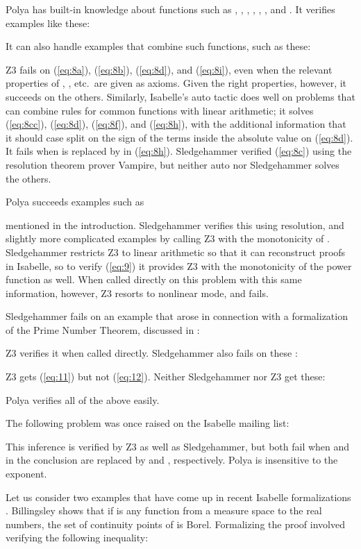 \documentclass[runningheds]{llncs}
\begin{document}
Polya has built-in knowledge about functions such as , , , , , , and . It verifies examples like these:

\noindent It can also handle examples that combine such functions, such as these:

Z3 fails on (\ref{eq:8a}), (\ref{eq:8b}), (\ref{eq:8d}), and (\ref{eq:8i}), even when the relevant properties of , , etc.\ are given as axioms. Given the right properties, however, it succeeds on the others. Similarly, Isabelle's auto tactic does well on problems that can combine rules for common functions with linear arithmetic; it solves (\ref{eq:8cc}), (\ref{eq:8d}), (\ref{eq:8f}), and (\ref{eq:8h}), with the additional information that it should case split on the sign of the terms inside the absolute value on (\ref{eq:8d}). It fails when  is replaced by  in (\ref{eq:8h}). Sledgehammer verified (\ref{eq:8c}) using the resolution theorem prover Vampire, but neither auto nor Sledgehammer solves the others.

Polya succeeds examples such as

mentioned in the introduction. Sledgehammer verifies this using resolution, and slightly more complicated examples by calling Z3 with the monotonicity of . Sledgehammer restricts Z3 to linear arithmetic so that it can reconstruct proofs in Isabelle, so to verify (\ref{eq:9}) it provides Z3 with the monotonicity of the power function as well. When called directly on this problem with this same information, however, Z3 resorts to nonlinear mode, and fails.

Sledgehammer fails on an example that arose in connection with a formalization of the Prime Number Theorem, discussed in \cite{avigad:et:al:07}:

Z3 verifies it when called directly. Sledgehammer also fails on these \cite{avigad:friedman:06}:

Z3 gets (\ref{eq:11}) but not (\ref{eq:12}). Neither Sledgehammer nor Z3 get these:

Polya verifies all of the above easily.

The following problem was once raised on the Isabelle mailing list:

This inference is verified by Z3 as well as Sledgehammer, but both fail when  and  in the conclusion are replaced by  and , respectively. Polya is insensitive to the exponent.

Let us consider two examples that have come up in recent Isabelle formalizations \cite{avigad:holzl:serafin:unp}. Billingsley  \cite[page 334]{billingsley:95} shows that if  is any function from a measure space to the real numbers, the set of continuity points of  is Borel. Formalizing the proof involved verifying the following inequality:
\end{document}
